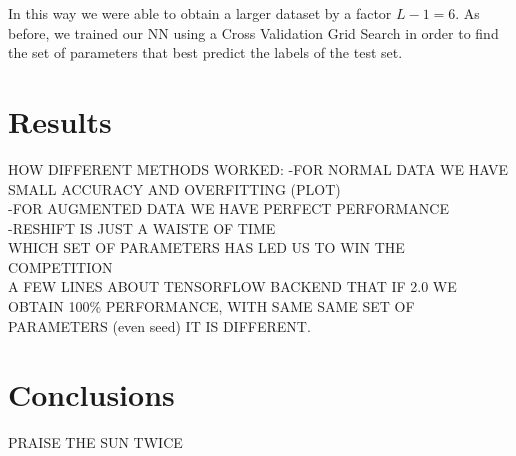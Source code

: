 \documentclass[prl,twocolumn]{revtex4-1}
\begin{document}
In this way we were able to obtain a larger dataset by a factor $L-1 = 6$. As before, we trained our NN using a Cross Validation Grid Search in order to find the set of parameters that best predict the labels of the test set.

\section{Results}

HOW DIFFERENT METHODS WORKED:
-FOR NORMAL DATA WE HAVE SMALL ACCURACY AND OVERFITTING (PLOT)\\
-FOR AUGMENTED DATA WE HAVE PERFECT PERFORMANCE\\
-RESHIFT IS JUST A WAISTE OF TIME\\

WHICH SET OF PARAMETERS HAS LED US TO WIN THE COMPETITION\\

A FEW LINES ABOUT TENSORFLOW BACKEND THAT IF 2.0 WE OBTAIN 100\% PERFORMANCE, WITH SAME SAME SET OF PARAMETERS (even seed) IT IS DIFFERENT. \\


\section{Conclusions}

PRAISE THE SUN TWICE

  





\begin{thebibliography}{99}


  
\end{thebibliography}
\end{document}
